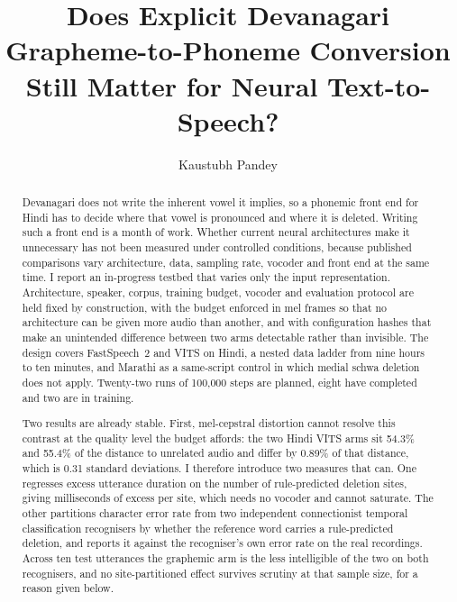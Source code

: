 \documentclass[runningheads]{llncs}
\begin{document}
\title{Does Explicit Devanagari Grapheme-to-Phoneme Conversion
Still Matter for Neural Text-to-Speech?}


\author{Kaustubh Pandey}


\maketitle

\begin{abstract}
Devanagari does not write the inherent vowel it implies, so a phonemic front
end for Hindi has to decide where that vowel is pronounced and where it is
deleted. Writing such a front end is a month of work. Whether current neural
architectures make it unnecessary has not been measured under controlled
conditions, because published comparisons vary architecture, data, sampling
rate, vocoder and front end at the same time. I report an in-progress
testbed that varies only the input representation. Architecture, speaker,
corpus, training budget, vocoder and evaluation protocol are held fixed by
construction, with the budget enforced in mel frames so that no architecture
can be given more audio than another, and with configuration hashes that make
an unintended difference between two arms detectable rather than invisible. The
design covers FastSpeech~2 and VITS on Hindi, a nested data ladder from nine
hours to ten minutes, and Marathi as a same-script control in which medial
schwa deletion does not apply. Twenty-two runs of 100{,}000 steps are planned,
eight have completed and two are in training.

Two results are already stable. First, mel-cepstral distortion cannot resolve
this contrast at the quality level the budget affords: the two Hindi VITS arms
sit 54.3\% and 55.4\% of the distance to unrelated audio and differ by 0.89\%
of that distance, which is 0.31 standard deviations. I therefore introduce two
measures that can. One regresses excess utterance duration on the number of
rule-predicted deletion sites, giving milliseconds of excess per site, which
needs no vocoder and cannot saturate. The other partitions character error
rate from two independent connectionist temporal classification recognisers by
whether the reference word carries a rule-predicted deletion, and reports it
against the recogniser's own error rate on the real recordings. Across ten
test utterances the graphemic arm is the less intelligible of the two on both
recognisers, and no site-partitioned effect survives scrutiny at that sample
size, for a reason given below.


\end{abstract}
\end{document}
